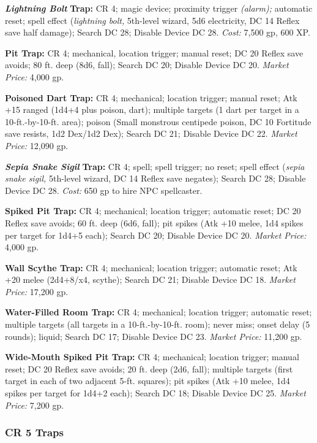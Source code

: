 \documentclass{article}
\begin{document}
\textit{\textbf{Lightning Bolt }}\textbf{Trap: }CR 4; magic device; proximity trigger 
\textit{(alarm); }automatic reset; spell effect (\textit{lightning bolt, }5th-level 
wizard, 5d6 electricity, DC 14 Reflex save half damage); Search DC 28; Disable 
Device DC 28. \textit{Cost: }7,500 gp, 600 XP.

\textbf{Pit Trap:} CR 4; mechanical, location trigger; manual reset; DC 20 Reflex 
save avoids; 80 ft. deep (8d6, fall); Search DC 20; Disable Device DC 20. \textit{Market 
Price: }4,000 gp.

\textbf{Poisoned Dart Trap:} CR 4; mechanical; location trigger; manual reset; 
Atk +15 ranged (1d4+4 plus poison, dart); multiple targets (1 dart per target in 
a 10-ft.-by-10-ft. area); poison (Small monstrous centipede poison, DC 10 Fortitude 
save resists, 1d2 Dex/1d2 Dex); Search DC 21; Disable Device DC 22. \textit{Market 
Price: }12,090 gp.

\textit{\textbf{Sepia Snake Sigil }}\textbf{Trap: }CR 4; spell; spell trigger; 
no reset; spell effect (\textit{sepia snake sigil, }5th-level wizard, DC 14 Reflex 
save negates); Search DC 28; Disable Device DC 28. \textit{Cost: }650 gp to hire 
NPC spellcaster.

\textbf{Spiked Pit Trap: }CR 4; mechanical; location trigger; automatic reset; 
DC 20 Reflex save avoids; 60 ft. deep (6d6, fall); pit spikes (Atk +10 melee, 1d4 
spikes per target for 1d4+5 each); Search DC 20; Disable Device DC 20. \textit{Market 
Price: }4,000 gp. 

\textbf{Wall Scythe Trap: }CR 4; mechanical; location trigger; automatic reset; 
Atk +20 melee (2d4+8/x4, scythe); Search DC 21; Disable Device DC 18. \textit{Market 
Price: }17,200 gp.

\textbf{Water-Filled Room Trap: }CR 4; mechanical; location trigger; automatic 
reset; multiple targets (all targets in a 10-ft.-by-10-ft. room); never miss; onset 
delay (5 rounds); liquid; Search DC 17; Disable Device DC 23. \textit{Market Price: 
}11,200 gp.

\textbf{Wide-Mouth Spiked Pit Trap:} CR 4; mechanical; location trigger; manual 
reset; DC 20 Reflex save avoids; 20 ft. deep (2d6, fall); multiple targets (first 
target in each of two adjacent 5-ft. squares); pit spikes (Atk +10 melee, 1d4 spikes 
per target for 1d4+2 each); Search DC 18; Disable Device DC 25. \textit{Market 
Price: }7,200 gp.

\vspace{12pt}
\subsubsection*{\textbf{CR 5 Traps}}
\end{document}
